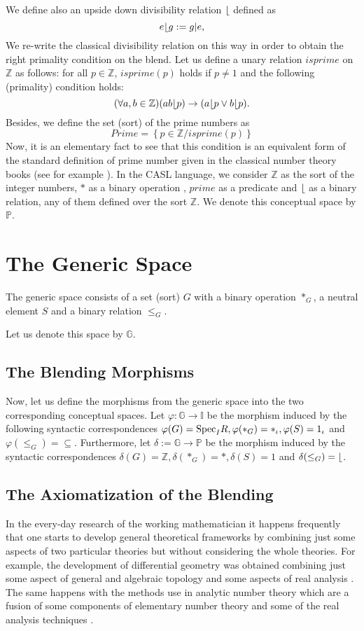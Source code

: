 We define also an upside down divisibility relation $\lfloor$ defined as 
%
\[e\lfloor g:=g|e,\] We re-write the classical divisibility relation
on this way in order to obtain the right primality condition on the
blend.  Let us define a unary relation $isprime$ on $\mathbb{Z}$ as
follows: for all $p\in \mathbb{Z}$, $isprime(p)$ holds if $p\neq 1$
and the following (primality) condition holds:
%
\[(\forall a,b\in \mathbb{Z})(ab \lfloor p)\rightarrow (a \lfloor p \vee b \lfloor p).\] 
Besides, we define the set (sort) of the prime numbers as 
\[ Prime=\left\{ p\in \mathbb{Z}/ isprime(p)\right\}\] Now, it is an
elementary fact to see that this condition is an equivalent form of
the standard definition of prime number given in the classical number
theory books (see for example \textcite{Apostol76}). In the CASL
language, we consider $\mathbb{Z}$ as the sort of the integer numbers,
$*$ as a binary operation , $prime$ as a predicate and $\lfloor$ as
a binary relation, any of them defined over the sort $\mathbb{Z}$.  We
denote this conceptual space by $\mathbb{P}$.

\section{The Generic Space}

The generic space consists of a set (sort) $G$ with a binary operation
$*_G$, a neutral element $S$ and a binary relation $\leq_G$.

  Let us denote this space by $\mathbb{G}$.

\subsection{The Blending Morphisms}
Now, let us define the morphisms from the generic space into the two corresponding conceptual spaces. Let $\varphi: \mathbb{G}\rightarrow \mathbb{I}$ be the morphism induced by the following syntactic correspondences $\varphi(G)={\rm Spec}_IR,\varphi(*_G)=*_{\iota}, \varphi(S)=1_{\iota}$ and $\varphi(\leq_G)=\subseteq$.
\newline\indent
Furthermore, let $\delta:=\mathbb{G}\rightarrow\mathbb{P}$ be the morphism induced by the syntactic correspondences $\delta(G)=\mathbb{Z}, \delta(*_G)=*, \delta(S)=1$ and $\delta(\leq_G)= \lfloor$.

\subsection{The Axiomatization of the Blending}
In the every-day research of the working mathematician it happens
frequently that one starts to develop general theoretical frameworks
by combining just some aspects of two particular theories but without
considering the whole theories. For example, the development of
differential geometry was obtained combining just some aspect of
general and algebraic topology and some aspects of real analysis
\cite{VelCad05}. The same happens with the methods use in
analytic number theory which are a fusion of some components of
elementary number theory and some of the real analysis techniques
\parencite{Apostol76}.

